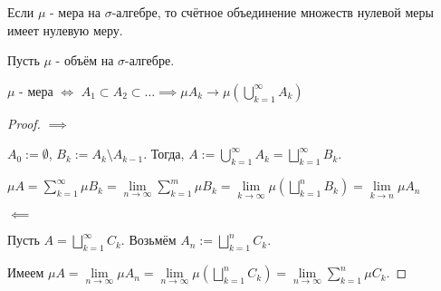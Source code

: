 \begin{consequence} \thmslashn

    Если $\mu$ - мера на $\sigma$-алгебре, то счётное объединение множеств нулевой меры имеет нулевую меру.
\end{consequence}
\begin{theorem} \thmslashn

    Пусть $\mu$ - объём на $\sigma$-алгебре.

    $\mu$ - мера $\iff$ $A_1 \subset A_2 \subset \ldots \implies \mu A_{k} \to \mu\left( \bigcup\limits_{k=1}^{\infty}  A_{k}\right)$
    \begin{proof} \thmslashn
    
        $\implies$


        $A_0 := \emptyset$, $B_{k} := A_{k} \setminus A_{k-1}$. Тогда, $A := \bigcup\limits_{k=1}^{\infty} A_{k} = \bigsqcup\limits_{k=1}^{\infty} B_{k}$.

        $\mu A = \sum\limits_{k=1}^{\infty} \mu B_{k} = \lim\limits_{n \to \infty} \sum\limits_{k=1}^{m} \mu B_{k} = \lim\limits_{k \to \infty}  \mu \left( \bigsqcup\limits_{k=1}^{n} B_{k} \right) = \lim\limits_{k \to n} \mu A_{n}$ 

        $\impliedby$

        Пусть $A = \bigsqcup\limits_{k=1}^{\infty} C_{k}$. Возьмём $A_{n} := \bigsqcup\limits_{k=1}^{n} C_{k}$.

        Имеем $\mu A = \lim\limits_{n \to \infty} \mu A_{n} = \lim\limits_{n \to \infty} \mu \left( \bigsqcup\limits_{k=1}^{n} C_{k} \right) = \lim\limits_{n \to \infty} \sum\limits_{k=1}^{n} \mu C_{k}$. \TODO
    \end{proof}
\end{theorem}
